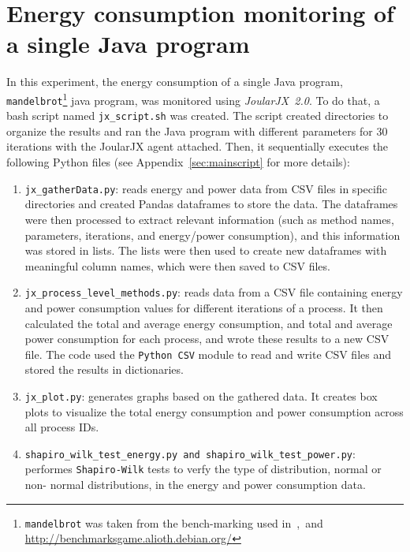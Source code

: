 \vspace{-10pt}
\section{Energy consumption monitoring of a single Java program}
\label{subsec: mandelbrot java program}

In this experiment, the energy consumption of a single Java program, \ie \texttt{mandelbrot}\footnote{\texttt{mandelbrot} was taken from the bench-marking used in~\cite{pereira2017energy},~\cite{couto2017towards}and~\cite{lima2016haskell} \url{http://benchmarksgame.alioth.debian.org/}} java program, was monitored using \textit{JoularJX~2.0}. 
To do that, a bash script named \texttt{jx\_script.sh} was created. 
The script created directories to organize the results and ran the Java program with different parameters for 30 iterations with the JoularJX agent attached. 
Then, 
it sequentially executes the following Python files (see Appendix~\ref{sec:mainscript} for more details): 
\begin{enumerate}
    \item \texttt{jx\_gatherData.py}: reads energy and power data from CSV files in specific directories and created Pandas dataframes to store the data. The dataframes were then processed to extract relevant information (such as method names, parameters, iterations, and energy/power consumption), and this information was stored in lists. The lists were then used to create new dataframes with meaningful column names, which were then saved to CSV files. 
    \item \texttt{jx\_process\_level\_methods.py}: reads data from a CSV file containing energy and power consumption values for different iterations of a process. It then calculated the total and average energy consumption, and total and average power consumption for each process, and wrote these results to a new CSV file. The code used the \texttt{Python CSV} module to read and write CSV files and stored the results in dictionaries. 
    \item \texttt{jx\_plot.py}: generates graphs based on the gathered data. It creates box plots to visualize the total energy consumption and power consumption across all process IDs. 
    \item \texttt{shapiro\_wilk\_test\_energy.py and shapiro\_wilk\_test\_power.py}: performes \texttt{Shapiro-Wilk} tests to verfy the type of distribution, \ie normal or non- normal distributions, 
    in the energy and power consumption data.\par
\end{enumerate}

